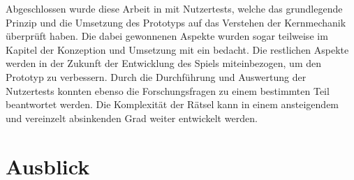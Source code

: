 Abgeschlossen wurde diese Arbeit in  mit Nutzertests, welche das grundlegende Prinzip und die Umsetzung des Prototyps auf das Verstehen der Kernmechanik überprüft haben. Die dabei gewonnenen Aspekte wurden sogar teilweise im Kapitel der Konzeption und Umsetzung mit ein bedacht. Die restlichen Aspekte werden in der Zukunft der Entwicklung des Spiels miteinbezogen, um den Prototyp zu verbessern. Durch die Durchführung und Auswertung der Nutzertests konnten ebenso die Forschungsfragen zu einem bestimmten Teil beantwortet werden. Die Komplexität der Rätsel kann in einem ansteigendem und vereinzelt absinkenden Grad weiter entwickelt werden.

\section{Ausblick}\label{sec:ausblick}
